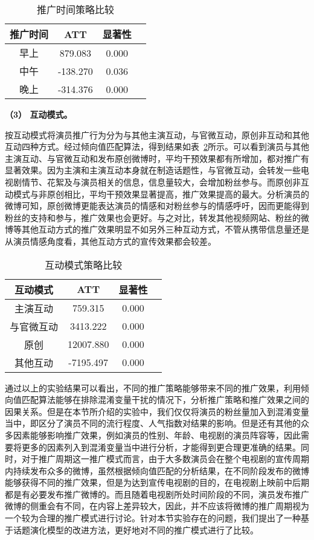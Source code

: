 \begin{table}[h]
\centering
\caption{推广时间策略比较}
\label{r2}
\begin{tabular}{|c|c|c|c|} \hline
推广时间& ATT & 显著性\\ \hline
早上 & 879.083& 0.000\\ \hline
中午 & -138.270& 0.036\\ \hline
晚上 & -314.376 & 0.000\\ 
\hline\end{tabular}

\end{table}

\textbf{（3） 互动模式。}

按互动模式将演员推广行为分为与其他主演互动，与官微互动，原创非互动和其他互动四种方式。经过倾向值匹配算法，得到结果如表~\ref{r3}所示。可以看到演员与其他主演互动、与官微互动和发布原创微博时，平均干预效果都有所增加，都对推广有显著效果。因为主演和主演互动本身就在制造话题性，与官微互动，会转发一些电视剧情节、花絮及与演员相关的信息，信息量较大，会增加粉丝参与。而原创非互动模式与非原创相比，平均干预效果显著提高，推广效果提高的最大。分析演员的微博可知，原创微博更能表达演员的情感和对粉丝参与的情感呼吁，因而更能得到粉丝的支持和参与，推广效果也会更好。与之对比，转发其他视频网站、粉丝的微博等其他互动方式的推广效果明显不如另外三种互动方式，不管从携带信息量还是从演员情感角度看，其他互动方式的宣传效果都会较差。

\begin{table}[h]
\centering
\caption{互动模式策略比较}
\label{r3}
\begin{tabular}{|c|c|c|c|} \hline
互动模式& ATT & 显著性\\ \hline
主演互动  & 759.315& 0.000\\ \hline
与官微互动 & 3413.222& 0.000\\ \hline
原创  & 12007.880& 0.000\\ \hline
其他互动 & -7195.497 & 0.000\\ 
\hline\end{tabular}
\end{table}

通过以上的实验结果可以看出，不同的推广策略能够带来不同的推广效果，利用倾向值匹配算法能够在排除混淆变量干扰的情况下，分析推广策略和推广效果之间的因果关系。但是在本节所介绍的实验中，我们仅仅将演员的粉丝量加入到混淆变量当中，即区分了演员不同的流行程度、人气指数对结果的影响。但是还有其他的众多因素能够影响推广效果，例如演员的性别、年龄、电视剧的演员阵容等，因此需要将更多的因素列入到混淆变量当中进行分析，才能得到更合理更准确的结果。同时，对于推广周期这一推广模式而言，由于大多数演员会在整个电视剧的宣传周期内持续发布众多的微博，虽然根据倾向值匹配的分析结果，在不同阶段发布的微博能够获得不同的推广效果，但是为达到宣传电视剧的目的，在电视剧上映前中后期都是有必要发布推广微博的。而且随着电视剧所处时间阶段的不同，演员发布推广微博的侧重会有不同，在内容上差异较大，因此，并不应该将微博的推广周期视为一个较为合理的推广模式进行讨论。针对本节实验存在的问题，我们提出了一种基于话题演化模型的改进方法，更好地对不同的推广模式进行了比较。

